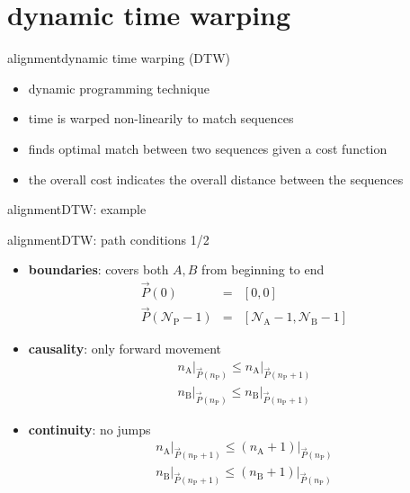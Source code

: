     \section[DTW]{dynamic time warping}
        \begin{frame}{alignment}{dynamic time warping (DTW)}
            \begin{itemize}
                \item   dynamic programming technique
                \item   time is warped non-linearily to match sequences
                \item   finds optimal match between two sequences given a cost function
                \item   the overall cost indicates the overall distance between the sequences
            \end{itemize}
        \end{frame}
        \begin{frame}{alignment}{DTW: example}
        \end{frame}
        \begin{frame}{alignment}{DTW: path conditions 1/2}
            \begin{itemize}
                    \item	\textbf{boundaries}: covers both $A,B$ from beginning to end
                            \begin{eqnarray*}
                                \vec{P}(0) 		&=& [0, 0] \\
                                \vec{P}(\mathcal{N}_{\mathrm{P}}-1) 	&=& [\mathcal{N}_\mathrm{A}-1, \mathcal{N}_\mathrm{B}-1] 
                            \end{eqnarray*}
                    \pause
                    \item	\textbf{causality}: only forward movement
                            \begin{eqnarray*}
                                n_\mathrm{A}\big|_{\vec{P}(n_\mathrm{P})} \leq n_\mathrm{A}\big|_{\vec{P}(n_\mathrm{P}+1)} \\ 
                                n_\mathrm{B}\big|_{\vec{P}(n_\mathrm{P})} \leq n_\mathrm{B}\big|_{\vec{P}(n_\mathrm{P}+1)} 
                            \end{eqnarray*}
                    \pause
                    \item	\textbf{continuity}: no jumps
                            \begin{eqnarray*}
                                n_\mathrm{A}\big|_{\vec{P}(n_\mathrm{P}+1)} \leq (n_\mathrm{A}+1)\big|_{\vec{P}(n_\mathrm{P})} \\ 
                                n_\mathrm{B}\big|_{\vec{P}(n_\mathrm{P}+1)} \leq (n_\mathrm{B}+1)\big|_{\vec{P}(n_\mathrm{P})} 
                            \end{eqnarray*}
            \end{itemize}
        \end{frame}
